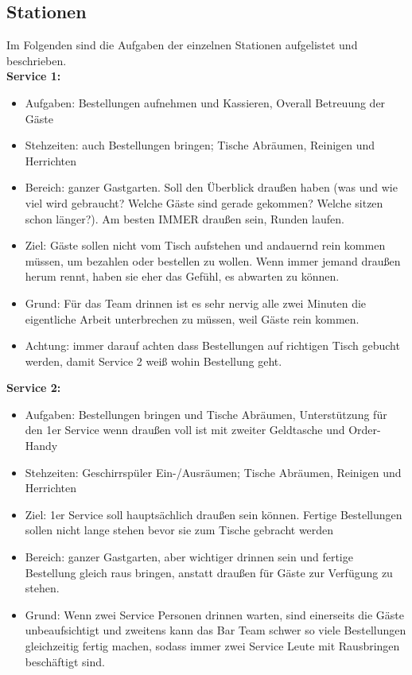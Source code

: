 \documentclass[a4paper,12pt]{article}
\begin{document}
\clearpage
\subsection{Stationen}
Im Folgenden sind die Aufgaben der einzelnen Stationen aufgelistet und beschrieben.\\

\textbf{Service 1:}
\begin{itemize}[topsep=0pt, itemsep=0pt]
    \item[]Aufgaben: Bestellungen aufnehmen und Kassieren, Overall Betreuung der Gäste
    \item[]Stehzeiten: auch Bestellungen bringen; Tische Abräumen, Reinigen und Herrichten
    \item[]Bereich:
    ganzer Gastgarten. Soll den Überblick draußen haben (was und wie viel wird gebraucht? Welche Gäste sind gerade gekommen? Welche sitzen schon länger?). Am besten IMMER draußen sein, Runden laufen.
    \item[]Ziel:
    Gäste sollen nicht vom Tisch aufstehen und andauernd rein kommen müssen, um bezahlen oder bestellen zu wollen. Wenn immer jemand draußen herum rennt, haben sie eher das Gefühl, es abwarten zu können. 
    \item[]Grund:
    Für das Team drinnen ist es sehr nervig alle zwei Minuten die eigentliche Arbeit unterbrechen zu müssen, weil Gäste rein kommen.
    \item[]Achtung:
    immer darauf achten dass Bestellungen auf richtigen Tisch gebucht werden, damit Service 2 weiß wohin Bestellung geht.
\end{itemize}
\vspace{1em}

\textbf{Service 2:}
\begin{itemize}[topsep=0pt, itemsep=0pt]
    \item[]Aufgaben: 
    Bestellungen bringen und Tische Abräumen, Unterstützung für den 1er Service wenn draußen voll ist mit zweiter Geldtasche und Order-Handy
    \item[] Stehzeiten: 
    Geschirrspüler Ein-/Ausräumen; Tische Abräumen, Reinigen und Herrichten
    \item[] Ziel:
    1er Service soll hauptsächlich draußen sein können. Fertige Bestellungen sollen nicht lange stehen bevor sie zum Tische gebracht werden
    \item[]Bereich:
    ganzer Gastgarten, aber wichtiger drinnen sein und fertige Bestellung gleich raus bringen, anstatt draußen für Gäste zur Verfügung zu stehen.
    \item[]Grund:
    Wenn zwei Service Personen drinnen warten, sind einerseits die Gäste unbeaufsichtigt und zweitens kann das Bar Team schwer so viele Bestellungen gleichzeitig fertig machen, sodass immer zwei Service Leute mit Rausbringen beschäftigt sind.
\end{itemize}
\vspace{1em}
\end{document}
